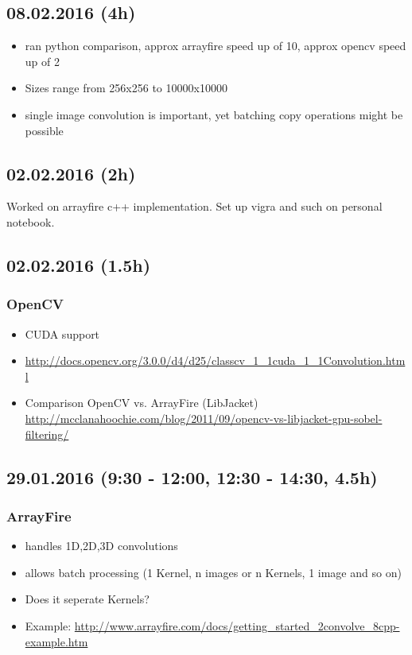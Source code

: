\documentclass[12pt,a4paper]{article}
\begin{document}
\subsection{08.02.2016 (4h)}
  \begin{itemize}
    \item ran python comparison, approx arrayfire speed up of 10, approx opencv speed up of 2
    \item Sizes range from 256x256 to 10000x10000
    \item single image convolution is important, yet batching copy operations might be possible
  \end{itemize}
  

\subsection{02.02.2016 (2h)}
  Worked on arrayfire c++ implementation. Set up vigra and such on personal notebook.

\subsection{02.02.2016 (1.5h)}

  \subsubsection{OpenCV}
    \begin{itemize}
      \item CUDA support
      \item \url{http://docs.opencv.org/3.0.0/d4/d25/classcv_1_1cuda_1_1Convolution.html}
      \item Comparison OpenCV vs. ArrayFire (LibJacket) \url{http://mcclanahoochie.com/blog/2011/09/opencv-vs-libjacket-gpu-sobel-filtering/}
    \end{itemize}


\subsection{29.01.2016 (9:30 - 12:00, 12:30 - 14:30, 4.5h)}

  \subsubsection{ArrayFire}
    \begin{itemize}
      \item handles 1D,2D,3D convolutions
      \item allows batch processing (1 Kernel, n images or n Kernels, 1 image and so on)
      \item Does it seperate Kernels?
      \item Example: \url{http://www.arrayfire.com/docs/getting_started_2convolve_8cpp-example.htm}
    \end{itemize}
\end{document}
